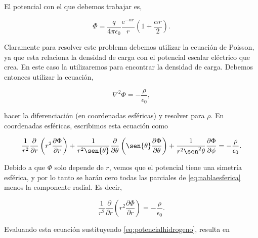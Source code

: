 \documentclass[a4paper,10pt]{article}
\numberwithin{equation}{section}
\newcommand{\euler}{\mathrm{e}}
\begin{document}
El potencial con el que debemos trabajar es, 

\begin{equation}
 \Phi = \frac{q}{4\pi\epsilon_0}\frac{\euler^{-\alpha r}}{r}\left(1 + 
\frac{\alpha r}{2}\right).
\label{eq:potencialhidrogeno}
\end{equation}

Claramente para resolver este problema debemos utilizar la ecuación de Poisson, ya 
que esta relaciona la densidad de carga con el potencial escalar eléctrico que 
crea. En este caso la utilizaremos para encontrar la densidad de carga. Debemos entonces 
utilizar la ecuación, 

\begin{equation}
 \nabla^2 \Phi = - \frac{\rho}{\epsilon_0},
\end{equation}

hacer la diferenciación (en coordenadas esféricas) y resolver para $\rho$. En coordenadas 
esféricas, escribimos esta ecuación como 

\begin{equation}
 \frac{1}{r^2}\frac{\partial}{\partial r}\left(r^2\frac{\partial \Phi}{\partial r}\right) +
 \frac{1}{r^2\sen{\theta}}\frac{\partial}{\partial \theta}
 \left(\sen{\theta}\frac{\partial \Phi}{\partial \theta} \right) + 
 \frac{1}{r^2\sen^2{\theta}}\frac{\partial \Phi}{\partial \phi} = 
 - \frac{\rho}{\epsilon_0}.
 \label{eq:nablaesferica}
\end{equation}

Debido a que $\Phi$ solo depende de $r$, vemos que el potencial tiene una simetría 
esférica, y por lo tanto se harán cero todas las parciales de \eqref{eq:nablaesferica} 
menos la componente radial. Es decir, 

\begin{equation}
 \frac{1}{r^2}\frac{\partial}{\partial r}\left(r^2\frac{\partial \Phi}{\partial r}\right) = 
 - \frac{\rho}{\epsilon_0}.
\end{equation}

Evaluando esta ecuación sustituyendo \eqref{eq:potencialhidrogeno}, resulta en 
\end{document}

